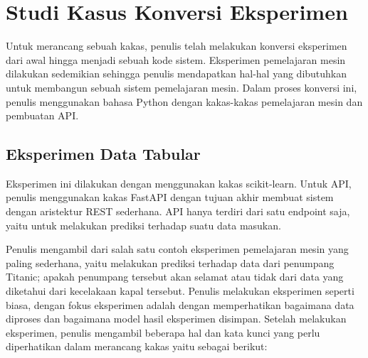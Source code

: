 \section{Studi Kasus Konversi Eksperimen}

Untuk merancang sebuah kakas, penulis telah melakukan konversi eksperimen dari awal hingga menjadi sebuah kode sistem.
Eksperimen pemelajaran mesin dilakukan sedemikian sehingga penulis mendapatkan hal-hal yang dibutuhkan untuk membangun sebuah sistem pemelajaran mesin.
Dalam proses konversi ini, penulis menggunakan bahasa Python dengan kakas-kakas pemelajaran mesin dan pembuatan API.

\subsection{Eksperimen Data Tabular}
Eksperimen ini dilakukan dengan menggunakan kakas scikit-learn.
Untuk API, penulis menggunakan kakas FastAPI dengan tujuan akhir membuat sistem dengan aristektur REST sederhana.
API hanya terdiri dari satu endpoint saja, yaitu untuk melakukan prediksi terhadap suatu data masukan.

Penulis mengambil dari salah satu contoh eksperimen pemelajaran mesin yang paling sederhana, yaitu melakukan prediksi terhadap data dari penumpang Titanic; apakah penumpang tersebut akan selamat atau tidak dari data yang diketahui dari kecelakaan kapal tersebut.
Penulis melakukan eksperimen seperti biasa, dengan fokus eksperimen adalah dengan memperhatikan bagaimana data diproses dan bagaimana model hasil eksperimen disimpan.
Setelah melakukan eksperimen, penulis mengambil beberapa hal dan kata kunci yang perlu diperhatikan dalam merancang kakas yaitu sebagai berikut:

